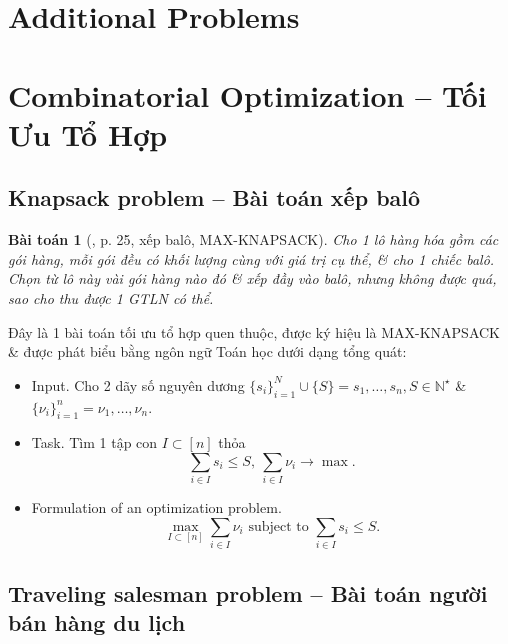 \documentclass{article}
\newtheorem{baitoan}{Bài toán}
\begin{document}
\section{Additional Problems}


\section{Combinatorial Optimization -- Tối Ưu Tổ Hợp}


\subsection{Knapsack problem -- Bài toán xếp balô}

\begin{baitoan}[\cite{Thanh_computational_complexity_theory}, p. 25, xếp balô, MAX-KNAPSACK]
    Cho 1 lô hàng hóa gồm các gói hàng, mỗi gói đều có khối lượng cùng với giá trị cụ thể, \& cho 1 chiếc balô. Chọn từ lô này vài gói hàng nào đó \& xếp đầy vào balô, nhưng không được quá, sao cho thu được 1 {\rm GTLN} có thể.
\end{baitoan}
Đây là 1 bài toán tối ưu tổ hợp quen thuộc, được ký hiệu là MAX-KNAPSACK \& được phát biểu bằng ngôn ngữ Toán học dưới dạng tổng quát:
\begin{itemize}
    \item {\sf Input.} Cho 2 dãy số nguyên dương $\{s_i\}_{i=1}^N\cup\{S\} = s_1,\ldots,s_n,S\in\mathbb{N}^\star$ \& $\{\nu_i\}_{i=1}^n = \nu_1,\ldots,\nu_n$.
    \item {\sf Task.} Tìm 1 tập con $I\subset[n]$ thỏa
    \begin{equation*}
        \sum_{i\in I} s_i\le S,\ \sum_{i\in I} \nu_i\to\max.
    \end{equation*}
    \item {\sf Formulation of an optimization problem.}
    \begin{equation*}
        \max_{I\subset[n]}\sum_{i\in I} \nu_i\mbox{ subject to }\sum_{i\in I} s_i\le S.
    \end{equation*}
\end{itemize}


\subsection{Traveling salesman problem -- Bài toán người bán hàng du lịch}
\end{document}
